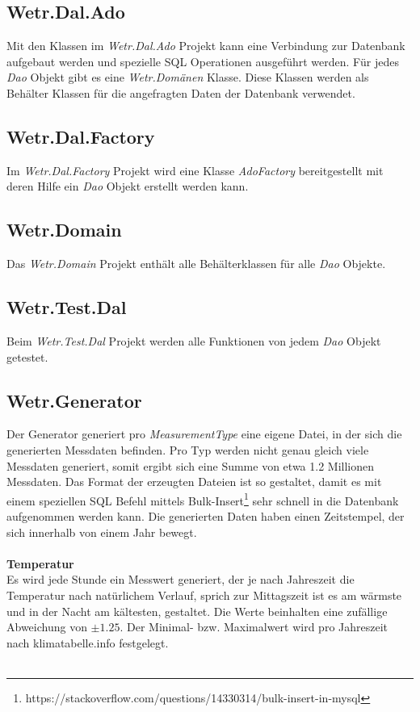 \subsection{Wetr.Dal.Ado}
Mit den Klassen im \textit{Wetr.Dal.Ado} Projekt kann eine Verbindung zur Datenbank aufgebaut werden und spezielle SQL Operationen ausgeführt werden. Für jedes \textit{Dao} Objekt gibt es eine \textit{Wetr.Domänen} Klasse. Diese Klassen werden als Behälter Klassen für die angefragten Daten der Datenbank verwendet.

\subsection{Wetr.Dal.Factory}
Im \textit{Wetr.Dal.Factory} Projekt wird eine Klasse \textit{AdoFactory} bereitgestellt mit deren Hilfe ein \textit{Dao} Objekt erstellt werden kann.

\subsection{Wetr.Domain}
Das \textit{Wetr.Domain} Projekt enthält alle Behälterklassen für alle \textit{Dao} Objekte.

\subsection{Wetr.Test.Dal}
Beim \textit{Wetr.Test.Dal} Projekt werden alle Funktionen von jedem \textit{Dao} Objekt getestet.

\subsection{Wetr.Generator}
\label{sec:generator}

Der Generator generiert pro \textit{MeasurementType} eine eigene Datei, in der sich die generierten Messdaten befinden. Pro Typ werden nicht genau gleich viele Messdaten generiert, somit ergibt sich eine Summe von etwa 1.2 Millionen Messdaten. Das Format der erzeugten Dateien ist so gestaltet, damit es mit einem speziellen SQL Befehl mittels Bulk-Insert\footnote{https://stackoverflow.com/questions/14330314/bulk-insert-in-mysql} sehr schnell in die Datenbank aufgenommen werden kann. Die generierten Daten haben einen Zeitstempel, der sich innerhalb von einem Jahr bewegt.~\\~\\ %

\textbf{Temperatur}\\
Es wird jede Stunde ein Messwert generiert, der je nach Jahreszeit die Temperatur nach natürlichem Verlauf, sprich zur Mittagszeit ist es am wärmste und in der Nacht am kältesten, gestaltet. Die Werte beinhalten eine zufällige Abweichung von $\pm 1.25$. Der Minimal- bzw. Maximalwert wird pro Jahreszeit nach klimatabelle.info festgelegt.~\\~\\ %

